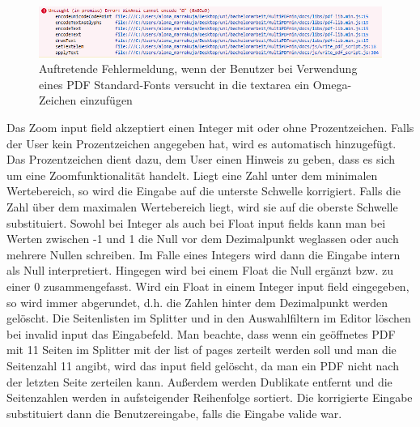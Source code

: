 \begin{figure}[!htbp]
	\centering
	\includegraphics[width=1\textwidth]{"images/font-error.png"}
	\caption{Auftretende Fehlermeldung, wenn der Benutzer bei Verwendung eines PDF Standard-Fonts versucht in die textarea ein Omega-Zeichen einzufügen}
	\label{fig:font-error}
\end{figure}

Das Zoom input field akzeptiert einen Integer mit oder ohne Prozentzeichen. Falls der User kein Prozentzeichen angegeben hat, wird es automatisch hinzugefügt. Das Prozentzeichen dient dazu, dem User einen Hinweis zu geben, dass es sich um eine Zoomfunktionalität handelt. Liegt eine Zahl unter dem minimalen Wertebereich, so wird die Eingabe auf die unterste Schwelle korrigiert. Falls die Zahl über dem maximalen Wertebereich liegt, wird sie auf die oberste Schwelle substituiert. Sowohl bei Integer als auch bei Float input fields kann man bei Werten zwischen -1 und 1 die Null vor dem Dezimalpunkt weglassen oder auch mehrere Nullen schreiben. Im Falle eines Integers wird dann die Eingabe intern als Null interpretiert. Hingegen wird bei einem Float die Null ergänzt bzw. zu einer 0 zusammengefasst. Wird ein Float in einem Integer input field eingegeben, so wird immer abgerundet, d.h. die Zahlen hinter dem Dezimalpunkt werden gelöscht. Die Seitenlisten im Splitter und in den Auswahlfiltern im Editor löschen bei invalid input das Eingabefeld. Man beachte, dass wenn ein geöffnetes PDF mit 11 Seiten im Splitter mit der list of pages zerteilt werden soll und man die Seitenzahl 11 angibt, wird das input field gelöscht, da man ein PDF nicht nach der letzten Seite zerteilen kann. Außerdem werden Dublikate entfernt und die Seitenzahlen werden in aufsteigender Reihenfolge sortiert. Die korrigierte Eingabe substituiert dann die Benutzereingabe, falls die Eingabe valide war. 

